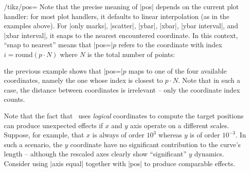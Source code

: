 {\begin{key}{/tikz/pos=}
	Note that the precise meaning of |pos| depends on the current plot handler: for most plot handlers, it defaults to linear interpolation (as in the examples above). For |only marks|, |scatter|, |ybar|, |xbar|, |ybar interval|, and |xbar interval|, it snaps to the nearest encountered coordinate. In this context, ``snap to nearest'' means that |pos=|$p$ refers to the coordinate with index $i = \text{round}(p \cdot N)$ where $N$ is the total number of points:
\begin{codeexample}[]
\end{codeexample}
	\noindent the previous example shows that |pos=|$p$ maps to one of the four available coordinates, namely the one whose index is closest to $p\cdot N$. Note that in such a case, the distance between coordinates is irrelevant -- only the coordinate index counts.


	Note that the fact that \PGFPlots\ uses \emph{logical} coordinates to compute the target positions can produce unexpected effects if $x$ and $y$ axis operate on a different scales. Suppose, for example, that $x$ is always of order $10^3$ whereas $y$ is of order $10^{-3}$. In such a scenario, the $y$ coordinate have no significant contribution to the curve's length -- although the rescaled axes clearly show ``significant'' $y$ dynamics. Consider using |axis equal| together with |pos| to produce comparable effects.
\end{key}

}
